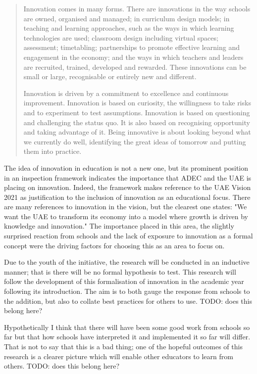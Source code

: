 \begin{quote}
Innovation comes in many forms. There are innovations in the way schools are owned, organised and managed; in curriculum design models; in teaching and learning approaches, such as the ways in which learning technologies are used; classroom design including virtual spaces; assessment; timetabling; partnerships to promote effective learning and engagement in the economy; and the ways in which teachers and leaders are recruited, trained, developed and rewarded. These innovations can be small or large, recognisable or entirely new and different.

Innovation is driven by a commitment to excellence and continuous improvement. Innovation is based on curiosity, the willingness to take risks and to experiment to test assumptions. Innovation is based on questioning and challenging the status quo. It is also based on recognising opportunity and taking advantage of it. Being innovative is about looking beyond what we currently do well, identifying the great ideas of tomorrow and putting them into practice.
\end{quote} \cite[p.12]{ADEC2015}

The idea of innovation in education is not a new one, but its prominent position in an inspection framework indicates the importance that ADEC and the UAE is placing on innovation. Indeed, the framework makes reference to the UAE Vision 2021 as justification to the inclusion of innovation as an educational focus. There are many references to innovation in the vision, but the clearest one states: "We want the UAE to transform its economy into a model where growth is driven by knowledge and innovation." \cite{UAEGovernment2012} The importance placed in this area, the slightly surprised reaction from schools and the lack of exposure to innovation as a formal concept were the driving factors for choosing this as an area to focus on.

Due to the youth of the initiative, the research will be conducted in an inductive manner; that is there will be no formal hypothesis to test. This research will follow the development of this formalisation of innovation in the academic year following its introduction. The aim is to both gauge the response from schools to the addition, but also to collate best practices for others to use. TODO: does this belong here?


Hypothetically I think that there will have been some good work from schools so far but that how schools have interpreted it and implemented it so far will differ. That is not to say that this is a bad thing; one of the hopeful outcomes of this research is a clearer picture which will enable other educators to learn from others. TODO: does this belong here?

